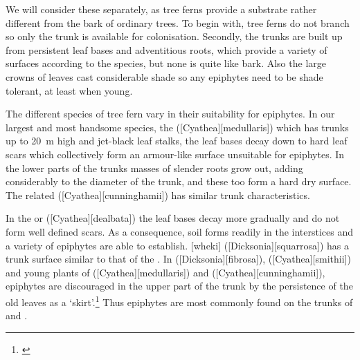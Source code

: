 We will consider these separately, as tree ferns provide a substrate rather different from the bark of ordinary trees.
To begin with, tree ferns do not branch so only the trunk is available for colonisation.
Secondly, the trunks are built up from persistent leaf bases and adventitious roots, which provide a variety of surfaces according to the species, but none is quite like bark.
Also the large crowns of leaves cast considerable shade so any epiphytes need to be shade tolerant, at least when young.

The different species of tree fern vary in their suitability for epiphytes.
In our largest and most handsome species, the  ([Cyathea][medullaris]) which has trunks up to \SI{20}{\metre} high and jet-black leaf stalks, the leaf bases decay down to hard leaf scars which collectively form an armour-like surface unsuitable for epiphytes.
In the lower parts of the trunks masses of slender roots grow out, adding considerably to the diameter of the trunk, and these too form a hard dry surface.
The related  ([Cyathea][cunninghamii]) has similar trunk characteristics.

In the  or  ([Cyathea][dealbata]) the leaf bases decay more gradually and do not form well defined scars.
As a consequence, soil forms readily in the interstices and a variety of epiphytes are able to establish.
[wheki] ([Dicksonia][squarrosa]) has a trunk surface similar to that of the .
In  ([Dicksonia][fibrosa]),  ([Cyathea][smithii]) and young plants of  ([Cyathea][medullaris]) and  ([Cyathea][cunninghamii]),  epiphytes are discouraged in the upper part of the trunk by the persistence of the old leaves as a `skirt'.\footnote{\cite{page1986tree}}
Thus epiphytes are most commonly found on the trunks of  and .

